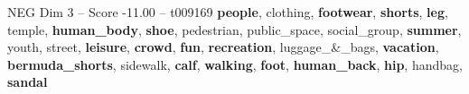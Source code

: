 \begin{textsample}{NEG Dim 3 – Score -11.00 – t009169}  \label{ex:f3_neg_033}
\textbf{people}, clothing, \textbf{footwear}, \textbf{shorts}, \textbf{leg}, temple, \textbf{human\_body}, \textbf{shoe}, pedestrian, public\_space, social\_group, \textbf{summer}, youth, street, \textbf{leisure}, \textbf{crowd}, \textbf{fun}, \textbf{recreation}, luggage\_\&\_bags, \textbf{vacation}, \textbf{bermuda\_shorts}, sidewalk, \textbf{calf}, \textbf{walking}, \textbf{foot}, \textbf{human\_back}, \textbf{hip}, handbag, \textbf{sandal}

\end{textsample}
